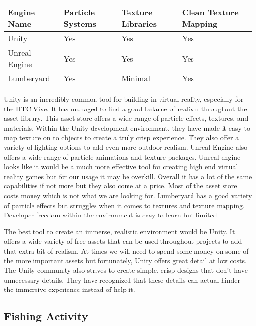 \documentclass[10pt,journal,compsoc,onecolumn, draftclsnofoot]{IEEEtran}
\begin{document}
\vspace{2mm}
\begin{table}[h!]
\centering
  \begin{tabu} to 1.0\textwidth { | X[l] || X[c] | X[c] | X[c] |  }
  \hline
  Engine Name & Particle Systems & Texture Libraries & Clean Texture Mapping\\
  \hline
  Unity  & Yes & Yes & Yes\\
  Unreal Engine & Yes & Yes & Yes\\
  Lumberyard & Yes & Minimal & Yes \\
  \hline
  \end{tabu}
\end{table}
\vspace{2mm}

Unity is an incredibly common tool for building in virtual reality, especially for the HTC Vive.
It has managed to find a good balance of realism throughout the asset library\cite{unity_store_age}.
This asset store offers a wide range of particle effects, textures, and materials.
Within the Unity development environment, they have made it easy to map texture on to objects to create a truly crisp experience.
They also offer a variety of lighting options to add even more outdoor realism.
Unreal Engine also offers a wide range of particle animations and texture packages\cite{unreal_editor_manual}.
Unreal engine looks like it would be a much more effective tool for creating high end virtual reality games but for our usage it may be overkill.
Overall it has a lot of the same capabilities if not more but they also come at a price.
Most of the asset store costs money which is not what we are looking for.
Lumberyard has a good variety of particle effects but struggles when it comes to textures and texture mapping\cite{lumberyard_levels_environment}.
Developer freedom within the environment is easy to learn but limited.

The best tool to create an immerse, realistic environment would be Unity.
It offers a wide variety of free assets that can be used throughout projects to add that extra bit of realism.
At times we will need to spend some money on some of the more important assets but fortunately, Unity offers great detail at low costs.
The Unity community also strives to create simple, crisp designs that don’t have unnecessary details.
They have recognized that these details can actual hinder the immersive experience instead of help it.
\vspace{2mm
}

\subsection{Fishing Activity}
\end{document}
